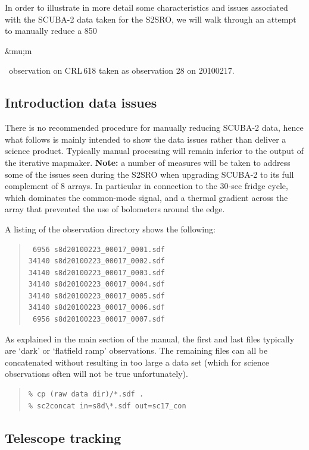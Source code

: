 \documentclass[twoside,11pt]{article}
\newcommand{\micron}{\mbox{\,${\umu}$m}}            %
\newcommand{\xlabel}[1]{}
\renewcommand{\_}{\texttt{\symbol{95}}}
\newenvironment{myquote}{\begin{quote}\begin{small}}{\end{small}\end{quote}}
\renewcommand{\micron}{\begin{rawhtml}&mu;m\end{rawhtml}}
\begin{document}
In order to illustrate in more detail some characteristics and issues
associated with the SCUBA-2 data taken for the S2SRO, we will walk
through an attempt to manually reduce a 850\micron\ observation on
CRL\,618 taken as observation 28 on 20100217.

\subsection{\xlabel{intro2}Introduction data issues}
\label{sec:intro2}

There is no recommended procedure for manually reducing SCUBA-2 data,
hence what follows is mainly intended to show the data issues rather
than deliver a science product. Typically manual processing will
remain inferior to the output of the iterative mapmaker. \textbf{Note:}
a number of measures will be taken to address some of the issues seen
during the S2SRO when upgrading SCUBA-2 to its full complement of 8
arrays. In particular in connection to the 30-sec fridge cycle, which
dominates the common-mode signal, and a thermal gradient across the
array that prevented the use of bolometers around the edge.

A listing of the observation directory shows the following:

\begin{myquote}
\begin{verbatim}
 6956 s8d20100223_00017_0001.sdf
34140 s8d20100223_00017_0002.sdf
34140 s8d20100223_00017_0003.sdf
34140 s8d20100223_00017_0004.sdf
34140 s8d20100223_00017_0005.sdf
34140 s8d20100223_00017_0006.sdf
 6956 s8d20100223_00017_0007.sdf
\end{verbatim}
\end{myquote}

As explained in the main section of the manual, the first and last
files typically are `dark' or `flatfield ramp' observations. The
remaining files can all be concatenated without resulting in too large
a data set (which for science observations often will not be true
unfortunately).

\begin{myquote}
\begin{verbatim}
% cp (raw data dir)/*.sdf .
% sc2concat in=s8d\*.sdf out=sc17_con
\end{verbatim}
\end{myquote}

\subsection{\xlabel{Tracking}Telescope tracking}
\label{sec:tracking}
\end{document}
